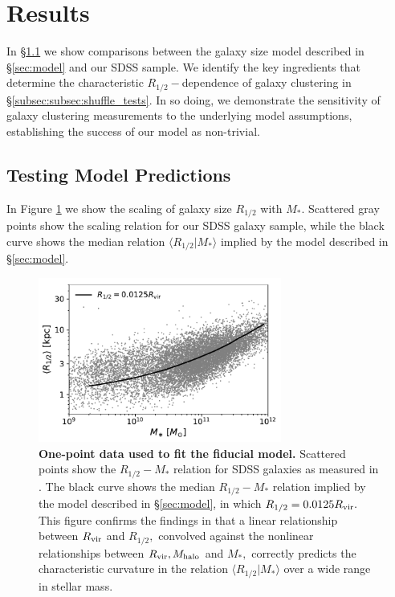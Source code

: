 \documentclass[usenatbib,usegraphicx,letterpaper]{mn2e}
\newcommand{\rhalf}{R_{1/2}}
\newcommand{\mstar}{M_{\ast}}
\newcommand{\mhalo}{M_{\rm halo}}
\newcommand{\rvir}{R_{\rm vir}}
\begin{document}
\section{Results}
\label{sec:results}

In \S\ref{subsec:predictions} we show comparisons between the galaxy size model described in \S\ref{sec:model} and our SDSS sample. We identify the key ingredients that determine the characteristic $\rhalf-$dependence of galaxy clustering in \S\ref{subsec:subsec:shuffle_tests}. In so doing, we demonstrate the sensitivity of galaxy clustering measurements to the underlying model assumptions, establishing the success of our model as non-trivial. 

\subsection{Testing Model Predictions}
\label{subsec:predictions}

In Figure \ref{fig:scatter_plot} we show the scaling of galaxy size $\rhalf$ with $\mstar.$ Scattered gray points show the scaling relation for our SDSS galaxy sample, while the black curve shows the median relation $\langle\rhalf\vert\mstar\rangle$ implied by the model described in \S\ref{sec:model}.

\begin{figure}
\centering
\includegraphics[width=8cm]{FIGS/single_component_model_vs_sdss_one_point.pdf}
\caption{
{\bf One-point data used to fit the fiducial model.}
Scattered points show the $\rhalf-\mstar$ relation for SDSS galaxies as measured in \citet{meert_etal15}. The black curve shows the median $\rhalf-\mstar$ relation implied by the model described in \S\ref{sec:model}, in which $\rhalf=0.0125\rvir.$ This figure confirms the findings in \citet{kravtsov13} that a linear relationship between $\rvir$ and $\rhalf,$ convolved against the nonlinear relationships between $\rvir, \mhalo$ and $\mstar,$ correctly predicts the characteristic curvature in the relation $\langle\rhalf\vert\mstar\rangle$ over a wide range in stellar mass.
}
\label{fig:scatter_plot}
\end{figure}
\end{document}
